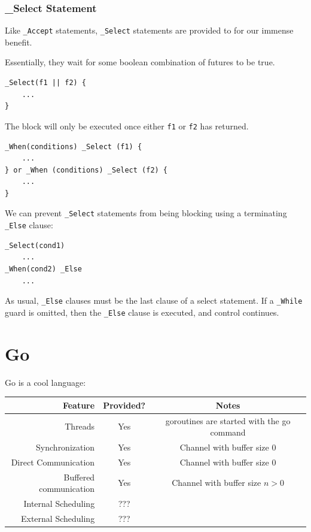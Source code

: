                 \subsubsection{\_Select Statement} %
                \label{ssub:_select_statement}
                    Like \verb|_Accept| statements, \verb|_Select| statements are provided to \uC for our immense benefit.

                    Essentially, they wait for some boolean combination of futures to be true.
                    \begin{lstlisting}
_Select(f1 || f2) {
    ...
}
                    \end{lstlisting}
                    The block will only be executed once either \verb|f1| or \verb|f2| has returned.
                    \begin{lstlisting}
_When(conditions) _Select (f1) {
    ...
} or _When (conditions) _Select (f2) {
    ...
}
                    \end{lstlisting}
                    We can prevent \verb|_Select| statements from being blocking using a terminating \verb|_Else| clause:
                    \begin{lstlisting}
_Select(cond1)
    ...
_When(cond2) _Else
    ...
                    \end{lstlisting}
                    As usual, \verb|_Else| clauses must be the last clause of a select statement.
                    If a \verb|_While| guard is omitted, then the \verb|_Else| clause is executed, and control continues.
        \section{Go} %
        \label{sec:go}
            Go is a cool language:
            \begin{table}[h]
                \label{tbl:go_concurrency}
                \centering
                \begin{tabular}{| r || c | c |}
                    \hline
                    Feature & Provided? & Notes \\ \hline \hline
                    Threads & Yes & goroutines are started with the go command \\ \hline
                    Synchronization & Yes & Channel with buffer size 0 \\ \hline
                    Direct Communication & Yes & Channel with buffer size 0 \\ \hline
                    Buffered communication & Yes & Channel with buffer size $n>0$ \\ \hline
                    Internal Scheduling & ??? & \\ \hline
                    External Scheduling & ??? & \\ \hline
                \end{tabular}
            \end{table}
